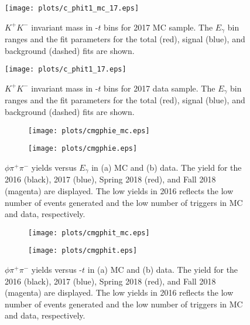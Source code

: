 \begin{figure}[H]
    \centering
    \texttt{[image: plots/c\_phit1\_mc\_17.eps]}
    \caption{\label{fig.y2175.xsec_ul.phi2pi.5}$K^{+}K^{-}$ invariant mass in -$t$ bins for 2017 MC sample. The $E_{\gamma}$ bin ranges and the fit parameters for the total (red), signal (blue), and background (dashed) fits are shown.}
\end{figure}

\begin{figure}[H]
    \centering
    \texttt{[image: plots/c\_phit1\_17.eps]}
    \caption{\label{fig.y2175.xsec_ul.phi2pi.6}$K^{+}K^{-}$ invariant mass in -$t$ bins for 2017 data sample. The $E_{\gamma}$ bin ranges and the fit parameters for the total (red), signal (blue), and background (dashed) fits are shown.}
\end{figure}

\begin{figure}[H]
    \centering
    \begin{subfigure}[b]{0.5\textwidth}
        \texttt{[image: plots/cmgphie\_mc.eps]}
        \caption{}
        \label{fig.y2175.xsec_ul.phi2pi.7.a}
    \end{subfigure}\hfill
    \begin{subfigure}[b]{0.5\textwidth}
        \texttt{[image: plots/cmgphie.eps]}
        \caption{}
        \label{fig.y2175.xsec_ul.phi2pi.7.b}
    \end{subfigure}
    \caption{\label{fig.y2175.xsec_ul.phi2pi.7}$\phi \pi^+ \pi^-$ yields versus $E_{\gamma}$ in (a) MC and (b) data. The yield for the 2016 (black), 2017 (blue), Spring 2018 (red), and Fall 2018 (magenta) are displayed. The low yields in 2016 reflects the low number of events generated and the low number of triggers in MC and data, respectively.}
\end{figure}

\begin{figure}[H]
    \centering
    \begin{subfigure}[b]{0.5\textwidth}
        \texttt{[image: plots/cmgphit\_mc.eps]}
        \caption{}
        \label{fig.y2175.xsec_ul.phi2pi.8.a}
    \end{subfigure}\hfill
    \begin{subfigure}[b]{0.5\textwidth}
        \texttt{[image: plots/cmgphit.eps]}
        \caption{}
        \label{fig.y2175.xsec_ul.phi2pi.8.b}
    \end{subfigure}
    \caption{\label{fig.y2175.xsec_ul.phi2pi.8}$\phi \pi^+ \pi^-$ yields versus -$t$ in (a) MC and (b) data. The yield for the 2016 (black), 2017 (blue), Spring 2018 (red), and Fall 2018 (magenta) are displayed. The low yields in 2016 reflects the low number of events generated and the low number of triggers in MC and data, respectively.}
\end{figure}

